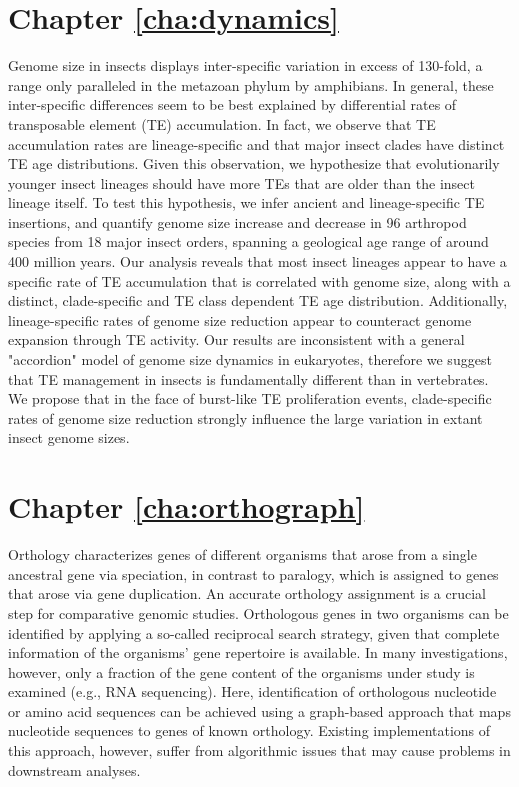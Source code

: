 \section*{Chapter \ref{cha:dynamics}}

Genome size in insects displays inter-specific variation in excess of
130-fold, a range only paralleled in the metazoan phylum by amphibians.
In general, these inter-specific differences seem to be best explained
by differential rates of transposable element (TE) accumulation.  In
fact, we observe that TE accumulation rates are lineage-specific and
that major insect clades have distinct TE age distributions.  Given this
observation, we hypothesize that evolutionarily younger insect lineages
should have more TEs that are older than the insect lineage itself.  To
test this hypothesis, we infer ancient and lineage-specific TE
insertions, and quantify genome size increase and decrease in 96
arthropod species from 18 major insect orders, spanning a geological age
range of around 400 million years.  Our analysis reveals that most
insect lineages appear to have a specific rate of TE accumulation that
is correlated with genome size, along with a distinct, clade-specific
and TE class dependent TE age distribution.  Additionally,
lineage-specific rates of genome size reduction appear to counteract
genome expansion through TE activity.  Our results are inconsistent with
a general "accordion" model of genome size dynamics in eukaryotes,
therefore we suggest that TE management in insects is fundamentally
different than in vertebrates.  We propose that in the face of
burst-like TE proliferation events, clade-specific rates of genome size
reduction strongly influence the large variation in extant insect genome
sizes.

\section*{Chapter \ref{cha:orthograph}}

Orthology characterizes genes of different organisms that arose from a
single ancestral gene via speciation, in contrast to paralogy, which is
assigned to genes that arose via gene duplication. An accurate orthology
assignment is a crucial step for comparative genomic studies.
Orthologous genes in two organisms can be identified by applying a
so-called reciprocal search strategy, given that complete information of
the organisms' gene repertoire is available. In many investigations,
however, only a fraction of the gene content of the organisms under
study is examined (e.g., RNA sequencing).  Here, identification of
orthologous nucleotide or amino acid sequences can be achieved using a
graph-based approach that maps nucleotide sequences to genes of known
orthology. Existing implementations of this approach, however, suffer
from algorithmic issues that may cause problems in downstream analyses.

